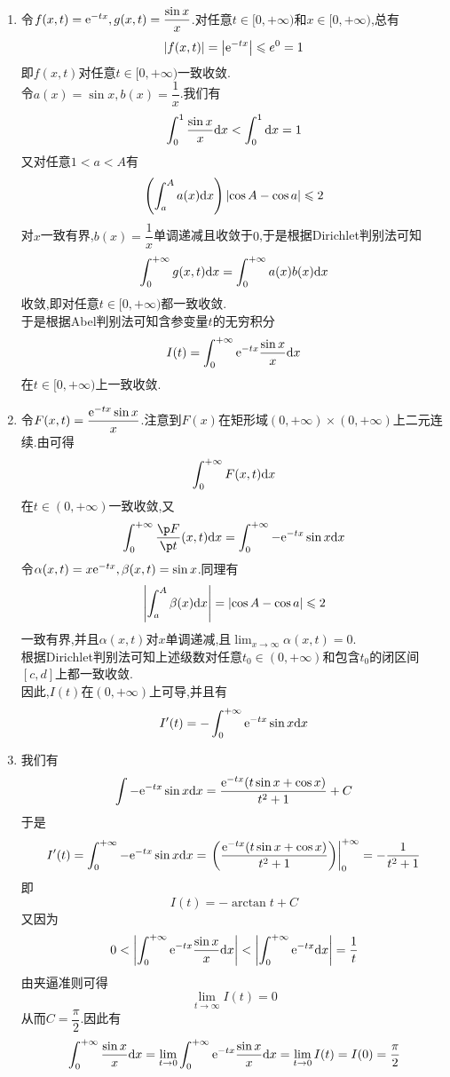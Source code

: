 \documentclass{ctexart}
\begin{document}
\begin{solution}
    \begin{enumerate}[label=\tbf{(\arabic*)},topsep=0pt,parsep=0pt,itemsep=0pt,partopsep=0pt]
        \item 令$f(x,t)=\mathrm{e}^{-tx},g(x,t)=\dfrac{\sin x}{x}$.对任意$t\in[0,+\infty)$和$x\in[0,+\infty)$,总有
            \[\left|f(x,t)\right|=\left|\mathrm{e}^{-tx}\right|\leqslant e^0=1\]
            即$f(x,t)$对任意$t\in[0,+\infty)$一致收敛.\\
            令$a(x)=\sin x,b(x)=\dfrac1x$.我们有
            \[\int_0^1\dfrac{\sin x}{x}\mathrm{d} x<\int_0^1\mathrm{d} x=1\]
            又对任意$1<a<A$有
            \[\left(\int_a^Aa(x)\mathrm{d} x\right)\left|\cos A-\cos a\right|\leqslant 2\]
            对$x$一致有界,$b(x)=\dfrac{1}{x}$单调递减且收敛于$0$,于是根据Dirichlet判别法可知
            \[\int_0^{+\infty}g(x,t)\mathrm{d} x=\int_0^{+\infty}a(x)b(x)\mathrm{d} x\]
            收敛,即对任意$t\in[0,+\infty)$都一致收敛.\\
            于是根据Abel判别法可知含参变量$t$的无穷积分
            \[I(t)=\int_0^{+\infty}\mathrm{e}^{-tx}\dfrac{\sin x}{x}\mathrm{d} x\]
            在$t\in[0,+\infty)$上一致收敛.
        \item 令$F(x,t)=\dfrac{\mathrm{e}^{-tx}\sin x}{x}$.注意到$F(x)$在矩形域$(0,+\infty)\times(0,+\infty)$上二元连续.由可得
            \[\int_0^{+\infty}F(x,t)\mathrm{d} x\]
            在$t\in(0,+\infty)$一致收敛,又
            \[\int_0^{+\infty}\dfrac{\p F}{\p t}(x,t)\di x=\int_0^{+\infty}-\e^{-tx}\sin x\di x\]
            令$\alpha(x,t)=x\mathrm{e}^{-tx},\beta(x,t)=\sin x$.同理有
            \[\left|\int_a^A\beta(x)\mathrm{d} x\right|=\left|\cos A-\cos a\right|\leqslant 2\]
            一致有界,并且$\alpha(x,t)$对$x$单调递减,且$\displaystyle\lim_{x\to\infty}\alpha(x,t)=0$.\\
            根据Dirichlet判别法可知上述级数对任意$t_0\in(0,+\infty)$和包含$t_0$的闭区间$[c,d]$上都一致收敛.\\
            因此,$I(t)$在$(0,+\infty)$上可导,并且有
            \[I'(t)=-\int_0^{+\infty}\mathrm{e}^{-tx}\sin x\mathrm{d} x\]
        \item 我们有
            \[\int-\mathrm{e}^{-tx}\sin x\mathrm{d} x=\dfrac{\mathrm{e}^{-tx}(t\sin x+\cos x)}{t^2+1}+C\]
            于是
            \[I'(t)=\int_0^{+\infty}-\mathrm{e}^{-tx}\sin x\mathrm{d} x
            =\left.\left(\dfrac{\mathrm{e}^{-tx}(t\sin x+\cos x)}{t^2+1}\right)\right|_0^{+\infty}
            =-\dfrac{1}{t^2+1}\]
            即
            \[I(t)=-\arctan t+C\]
            又因为
            \[0<\left|\int_0^{+\infty}\mathrm{e}^{-tx}\dfrac{\sin x}{x}\mathrm{d} x\right|
            <\left|\int_0^{+\infty}\mathrm{e}^{-tx}\mathrm{d} x\right|=\dfrac1t\]
            由夹逼准则可得
            \[\lim_{t\to\infty}I(t)=0\]
            从而$C=\dfrac\pi2$.因此有
            \[\int_0^{+\infty}\dfrac{\sin x}{x}\mathrm{d} x
            =\lim_{t\to0}\int_0^{+\infty}\mathrm{e}^{-tx}\dfrac{\sin x}{x}\mathrm{d} x
            =\lim_{t\to0}I(t)=I(0)=\dfrac\pi2\]

    \end{enumerate}
\end{solution}
\end{document}
